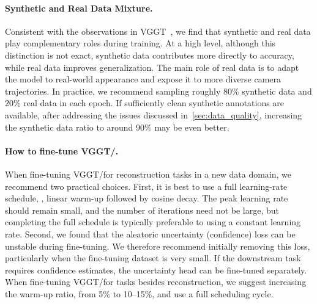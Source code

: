 \paragraph{Synthetic and Real Data Mixture.}

Consistent with the observations in VGGT~\cite{wang25vggt}, we find that synthetic and real data play complementary roles during training.
At a high level, although this distinction is not exact, synthetic data contributes more directly to accuracy, while real data improves generalization.
The main role of real data is to adapt the model to real-world appearance and expose it to more diverse camera trajectories.
In practice, we recommend sampling roughly 80\% synthetic data and 20\% real data in each epoch.
If sufficiently clean synthetic annotations are available, \eg after addressing the issues discussed in~\cref{sec:data_quality}, increasing the synthetic data ratio to around 90\% may be even better.

\paragraph{How to fine-tune VGGT/\method.}

When fine-tuning VGGT/\method for reconstruction tasks in a new data domain, we recommend two practical choices.
First, it is best to use a full learning-rate schedule, \ie, linear warm-up followed by cosine decay.
The peak learning rate should remain small, and the number of iterations need not be large, but completing the full schedule is typically preferable to using a constant learning rate.
Second, we found that the aleatoric uncertainty (confidence) loss can be unstable during fine-tuning.
We therefore recommend initially removing this loss, particularly when the fine-tuning dataset is very small.
If the downstream task requires confidence estimates, the uncertainty head can be fine-tuned separately.
When fine-tuning VGGT/\method for tasks besides reconstruction, we suggest increasing the warm-up ratio, \eg from 5\% to 10--15\%, and use a full scheduling cycle.


